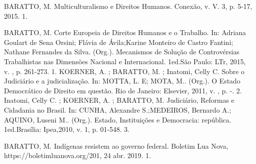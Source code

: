 

\begin{cvhonors}
  \cvhonor
    {BARATTO, M.}
    {Multiculturalismo e Direitos Humanos. Conexão, v. V. 3, p. 5-17, 2015.}
    {}
    {1. }
\end{cvhonors}



\begin{cvhonors}
  \cvhonor
    {BARATTO, M.}
    {Corte Europeia de Direitos Humanos e o Trabalho. In: Adriana Goulart de Sena Orsini; Flávia de Ávila;Karine Monteiro de Castro Fantini; Nathane Fernandes da Silva. (Org.). Mecanismos de Solução de Controvérsias Trabalhistas nas Dimensões Nacional e Internacional. 1ed.São Paulo: LTr, 2015, v. , p. 261-273.}
    {}
    {1. }
  \cvhonor
    {KOERNER, A. ; BARATTO, M. ; Inatomi, Celly C.}
    {Sobre o Judiciário e a judicialização. In: MOTTA, L. E; MOTA, M.. (Org.).
   O Estado Democrático de Direito em questão. Rio de Janeiro: Elsevier, 2011, v. , p. -.}
    {}
    {2. }
  \cvhonor
    {Inatomi, Celly C. ; KOERNER, A. ; BARATTO, M.}
    {Judiciário, Reformas e Cidadania no Brasil. In: CUNHA, Alexandre S.;MEDEIROS, Bernardo A.; AQUINO, Luseni M.. (Org.). Estado, Instituições e Democracia: república. 1ed.Brasília: Ipea,2010, v. 1, p. 01-548.}
    {}
    {3. }
\end{cvhonors}


\begin{cvhonors}
  \cvhonor
    {BARATTO, M.}
    {Indígenas resistem ao governo federal. Boletim Lua Nova, https://boletimluanova.org/201, 24 abr. 2019.}
    {}
    {1. }
\end{cvhonors}
\pagebreak
{}

